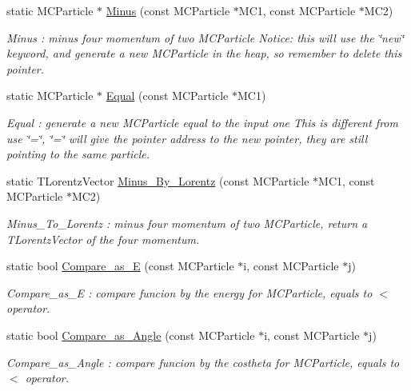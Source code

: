 \begin{DoxyCompactItemize}
static MCParticle $\ast$ \hyperlink{classToolSet_1_1CMC_aa597db31bacbc37cbc16da5bfe2b1d9a}{Minus} (const MCParticle $\ast$MC1, const MCParticle $\ast$MC2)
\begin{DoxyCompactList}\small\item\em Minus : minus four momentum of two MCParticle Notice: this will use the \char`\"{}new\char`\"{} keyword, and generate a new MCParticle in the heap, so remember to delete this pointer. \item\end{DoxyCompactList}\item 
static MCParticle $\ast$ \hyperlink{classToolSet_1_1CMC_a29838e430204b6f0d6e5cdf8a669f615}{Equal} (const MCParticle $\ast$MC1)
\begin{DoxyCompactList}\small\item\em Equal : generate a new MCParticle equal to the input one This is different from use \char`\"{}=\char`\"{}, \char`\"{}=\char`\"{} will give the pointer address to the new pointer, they are still pointing to the same particle. \item\end{DoxyCompactList}\item 
static TLorentzVector \hyperlink{classToolSet_1_1CMC_a5883ceda367cc5e32cbacdabdc119a4a}{Minus\_\-By\_\-Lorentz} (const MCParticle $\ast$MC1, const MCParticle $\ast$MC2)
\begin{DoxyCompactList}\small\item\em Minus\_\-To\_\-Lorentz : minus four momentum of two MCParticle, return a TLorentzVector of the four momentum. \item\end{DoxyCompactList}\item 
static bool \hyperlink{classToolSet_1_1CMC_a74a827b8a208cbf1ef83ee66b2a9dc04}{Compare\_\-as\_\-E} (const MCParticle $\ast$i, const MCParticle $\ast$j)
\begin{DoxyCompactList}\small\item\em Compare\_\-as\_\-E : compare funcion by the energy for MCParticle, equals to $<$ operator. \item\end{DoxyCompactList}\item 
static bool \hyperlink{classToolSet_1_1CMC_a4043b9e78a5178c2d8fba7f6543a7e65}{Compare\_\-as\_\-Angle} (const MCParticle $\ast$i, const MCParticle $\ast$j)
\begin{DoxyCompactList}\small\item\em Compare\_\-as\_\-Angle : compare funcion by the costheta for MCParticle, equals to $<$ operator. \item\end{DoxyCompactList}\item 

\end{DoxyCompactItemize}

